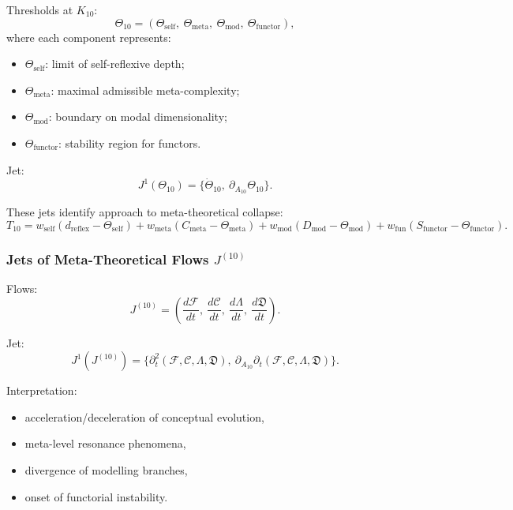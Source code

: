 Thresholds at $K_{10}$:
\[
\Theta_{10}
=
(\Theta_{\mathrm{self}},\
 \Theta_{\mathrm{meta}},\
 \Theta_{\mathrm{mod}},\
 \Theta_{\mathrm{functor}}),
\]
where each component represents:
\begin{itemize}
    \item $\Theta_{\mathrm{self}}$: limit of self-reflexive depth;
    \item $\Theta_{\mathrm{meta}}$: maximal admissible meta-complexity;
    \item $\Theta_{\mathrm{mod}}$: boundary on modal dimensionality;
    \item $\Theta_{\mathrm{functor}}$: stability region for functors.
\end{itemize}

Jet:
\[
J^1(\Theta_{10})
=
\{\dot{\Theta}_{10},\ \partial_{A_{10}}\Theta_{10}\}.
\]

These jets identify approach to meta-theoretical collapse:
\[
T_{10}
=
w_{\mathrm{self}}(d_{\mathrm{reflex}}-\Theta_{\mathrm{self}})
+
w_{\mathrm{meta}}(C_{\mathrm{meta}}-\Theta_{\mathrm{meta}})
+
w_{\mathrm{mod}}(D_{\mathrm{mod}}-\Theta_{\mathrm{mod}})
+
w_{\mathrm{fun}}(S_{\mathrm{functor}}-\Theta_{\mathrm{functor}}).
\]


\subsubsection{Jets of Meta-Theoretical Flows $J^{(10)}$}

Flows:
\[
J^{(10)}
=
\left(
\frac{d\mathcal{F}}{dt},\
\frac{d\mathcal{C}}{dt},\
\frac{d\Lambda}{dt},\
\frac{d\mathfrak{D}}{dt}
\right).
\]

Jet:
\[
J^1(J^{(10)})=
\Big\{
\partial_t^2(\mathcal{F},\mathcal{C},\Lambda,\mathfrak{D}),\
\partial_{A_{10}}\partial_t(\mathcal{F},\mathcal{C},\Lambda,\mathfrak{D})
\Big\}.
\]

Interpretation:
\begin{itemize}
    \item acceleration/deceleration of conceptual evolution,
    \item meta-level resonance phenomena,
    \item divergence of modelling branches,
    \item onset of functorial instability.
\end{itemize}



